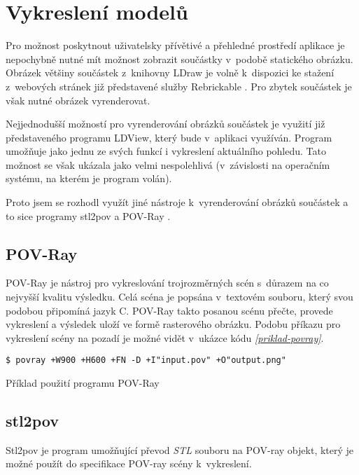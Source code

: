 \section{Vykreslení modelů}\label{reserse-vykresleni}
Pro možnost poskytnout uživatelsky přívětivé a přehledné prostředí aplikace je nepochybně nutné mít možnost zobrazit součástky v~podobě statického obrázku. Obrázek většiny součástek z~knihovny LDraw je volně k~dispozici ke stažení z~webových stránek již představené služby Rebrickable \autocite{rebrickable:download}. Pro zbytek součástek je však nutné obrázek vyrenderovat. 

Nejjednodušší možností pro vyrenderování obrázků součástek je využití již představeného programu LDView, který bude v~aplikaci využíván. Program umožňuje jako jednu ze svých funkcí i vykreslení aktuálního pohledu. Tato možnost se však ukázala jako velmi nespolehlivá (v~závislosti na operačním systému, na kterém je program volán).

Proto jsem se rozhodl využít jiné nástroje k~vyrenderování obrázků součástek a to sice programy stl2pov \autocite{stl2pov} a POV-Ray \autocite{povray}.

\subsection{POV-Ray}
POV-Ray je nástroj pro vykreslování trojrozměrných scén s~důrazem na co nejvyšší kvalitu výsledku. Celá scéna je popsána v~textovém souboru, který svou podobou připomíná jazyk C. POV-Ray takto posanou scénu přečte, provede vykreslení a výsledek uloží ve formě rasterového obrázku. \autocite{root:povray} Podobu příkazu pro vykreslení scény na pozadí je možné vidět v~ukázce kódu \emph{\ref{priklad-povray}}. 

\begin{listing}[htbp]
        \begin{verbatim}
$ povray +W900 +H600 +FN -D +I"input.pov" +O"output.png" 
        \end{verbatim}
    \caption{Příklad použití programu POV-Ray \label{priklad-povray}}
\end{listing}

\subsection{stl2pov}
Stl2pov je program umožňující převod \textit{\gls{STL}} souboru na POV-ray objekt, který je možné použít do specifikace POV-ray scény k~vykreslení.  
